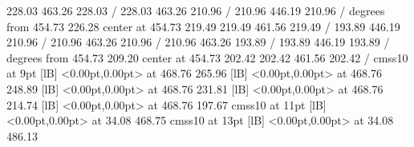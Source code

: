 { 228.03 463.26 228.03 /
 228.03 463.26 210.96 /
 210.96 446.19 210.96 /
 degrees from 454.73 226.28 center at 454.73 219.49
\setdashpattern <4pt, 4pt>
 219.49 461.56 219.49 /
\setsolid
{} 193.89 446.19 210.96 /
 210.96 463.26 210.96 /
 210.96 463.26 193.89 /
 193.89 446.19 193.89 /
 degrees from 454.73 209.20 center at 454.73 202.42
\setdashpattern <4pt, 4pt>
 202.42 461.56 202.42 /
\font\picfont cmss10 at 9pt\picfont
{}  [lB] <0.00pt,0.00pt> at 468.76 265.96
  [lB] <0.00pt,0.00pt> at 468.76 248.89
  [lB] <0.00pt,0.00pt> at 468.76 231.81
  [lB] <0.00pt,0.00pt> at 468.76 214.74
  [lB] <0.00pt,0.00pt> at 468.76 197.67
\font\picfont cmss10 at 11pt\picfont
{}  [lB] <0.00pt,0.00pt> at 34.08 468.75
\font\picfont cmss10 at 13pt\picfont
{}  [lB] <0.00pt,0.00pt> at 34.08 486.13
\endpicture
}
